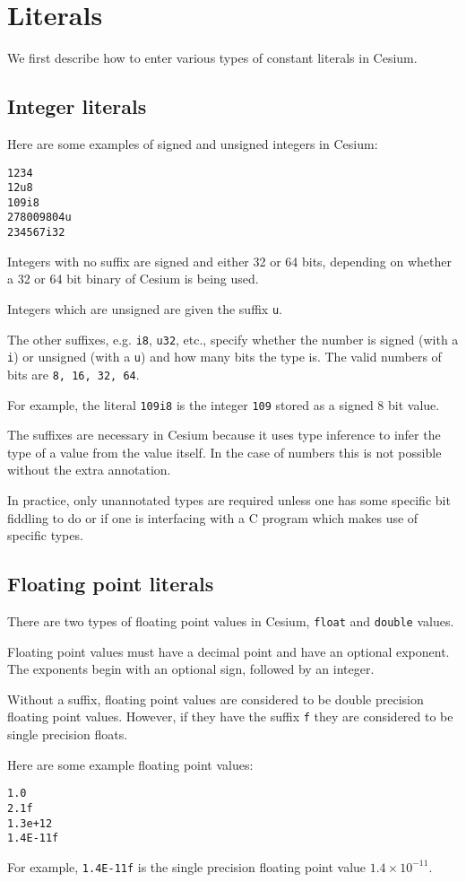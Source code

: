 \documentclass[a4paper,10pt]{article}
\newcommand{\code}{\lstinline}
\begin{document}
\section{Literals}

We first describe how to enter various types of constant literals in Cesium.  

\subsection{Integer literals}

Here are some examples of signed and unsigned integers in Cesium:

\begin{lstlisting}
1234
12u8
109i8
278009804u
234567i32
\end{lstlisting}

Integers with no suffix are signed and either 32 or 64 bits, depending on whether a 32 or 
64 bit binary of Cesium is being used.

Integers which are unsigned are given the suffix \code{u}. 

The other suffixes, e.g. \code{i8}, \code{u32}, etc., specify whether the number is signed
(with a \code{i}) or unsigned (with a \code{u}) and how many bits the type is. The valid 
numbers of bits are \code{8, 16, 32, 64}.

For example, the literal \code{109i8} is the integer \code{109} stored as a signed 8 bit 
value.

The suffixes are necessary in Cesium because it uses type inference to infer the type of a
value from the value itself. In the case of numbers this is not possible without the extra 
annotation. 

In practice, only unannotated types are required unless one has some specific bit fiddling 
to do or if one is interfacing with a C program which makes use of specific types.

\subsection{Floating point literals}

There are two types of floating point values in Cesium, \code{float} and \code{double} values.

Floating point values must have a decimal point and have an optional exponent. The exponents 
begin with an optional sign, followed by an integer. 

Without a suffix, floating point values are considered to be double precision floating point 
values. However, if they have the suffix \code{f} they are considered to be single precision 
floats.

Here are some example floating point values:

\begin{lstlisting}
1.0
2.1f
1.3e+12
1.4E-11f
\end{lstlisting}

For example, \code{1.4E-11f} is the single precision floating point value $1.4\times 10^{-11}$.
\end{document}
